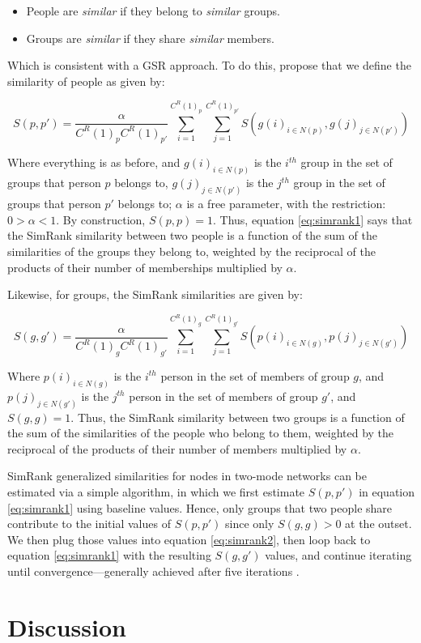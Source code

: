 \documentclass[a4paper,fleqn]{cas-sc}
\begin{document}
\begin{itemize}
    \item People are \textit{similar} if they belong to \textit{similar} groups.
    \item Groups are \textit{similar} if they share \textit{similar} members.
\end{itemize}

Which is consistent with a GSR approach. To do this, \citet[540, eq2 and eq3]{jeh2002simrank} propose that we define the similarity of people as given by:

\begin{equation}
    S(p, p') = \frac{\alpha}{C^R(1)_pC^R(1)_{p'}}
    \sum_{i = 1}^{C^R(1)_p} \sum_{j = 1}^{C^R(1)_{p'}} 
    S\left(g(i)_{i \in N(p)}, g(j)_{j \in N(p')}\right)
    \label{eq:simrank1}
\end{equation}

Where everything is as before, and $g(i)_{i \in N(p)}$ is the $i^{th}$ group in the set of groups that person $p$ belongs to, $g(j)_{j \in N(p')}$ is the $j^{th}$ group in the set of groups that person $p'$ belongs to; $\alpha$ is a free parameter, with the restriction: $0 > \alpha < 1$. By construction, $S(p, p) = 1$. Thus, equation \ref{eq:simrank1} says that the SimRank similarity between two people is a function of the sum of the similarities of the groups they belong to, weighted by the reciprocal of the products of their number of memberships multiplied by $\alpha$.

Likewise, for groups, the SimRank similarities are given by:

\begin{equation}
    S(g, g') = \frac{\alpha}{C^R(1)_gC^R(1)_{g'}}
    \sum_{i = 1}^{C^R(1)_g} \sum_{j = 1}^{C^R(1)_{g'}} 
    S\left(p(i)_{i \in N(g)}, p(j)_{j \in N(g')}\right)
    \label{eq:simrank2}
\end{equation}

Where $p(i)_{i \in N(g)}$ is the $i^{th}$ person in the set of members of group $g$, and $p(j)_{j \in N(g')}$ is the $j^{th}$ person in the set of members of group $g'$, and $S(g, g) = 1$. Thus, the SimRank similarity between two groups is a function of the sum of the similarities of the people who belong to them, weighted by the reciprocal of the products of their number of members multiplied by $\alpha$.

SimRank generalized similarities for nodes in two-mode networks can be estimated via a simple algorithm, in which we first estimate $S(p, p')$ in equation \ref{eq:simrank1} using baseline values. Hence, only groups that two people share contribute to the initial values of $S(p, p')$ since only $S(g, g)>0$ at the outset. We then plug those values into equation \ref{eq:simrank2}, then loop back to equation \ref{eq:simrank1} with the resulting $S(g, g')$ values, and continue iterating until convergence---generally achieved after five iterations \citep{jeh2002simrank}. 

\section{Discussion}
%


\end{document}
